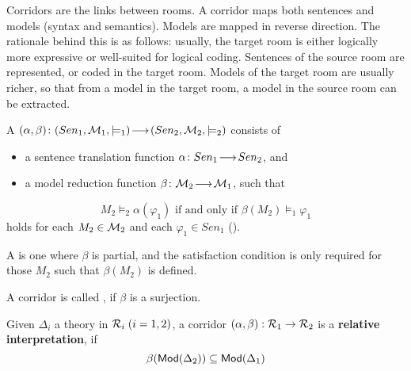 \documentclass[%
\ifpretendfinal
final%
\else
draft%
\fi,
a4paper,
wd]{isov2}
\begin{document}
Corridors are the links between rooms. A corridor maps both sentences
and models (syntax and semantics). Models are mapped in reverse
direction. The rationale behind this is as follows: usually, the
target room is either logically more expressive or well-suited for
logical coding. Sentences of the source room are represented, or coded
in the target room. Models of the target room are usually richer, so
that from a model in the target room, a model in the source room can
be extracted.
\begin{definition}\label{def:corridor}
A 
$
(\alpha,\beta)\map{(Sen_1,\cM_1,\models_1)}{(Sen_2,\cM_2,\models_2)}
$
 consists of
\begin{itemize}
\item a sentence translation function $\alpha\colon Sen_1\!\longrightarrow\!Sen_2$, and
\item a model reduction function
$\beta\map{\cM_2}{\cM_1}$, 
such that
\end{itemize}
$$M_2\models_2 \alpha(\varphi_1) \mbox{ if and only if } 
\beta(M_2)\models_1 \varphi_1$$
holds for each $M_2\in \cM_2$ and each $\varphi_1\in Sen_1$
().

A  is one where $\beta$ is partial,
and the satisfaction condition is only required for those $M_2$
such that $\beta(M_2)$ is defined.
\end{definition}
A corridor is called , if $\beta$ is a surjection.

\begin{definition}
  Given $\Delta_i$ a theory in $\cR_i\;(i=1,2)$, a corridor $(\alpha,\beta):\cR_1\to \cR_2$ is a \textbf{relative interpretation}, if
\[
\beta(\mathsf{Mod}(\Delta_2))\subseteq \mathsf{Mod}(\Delta_1)
\]
\end{definition}
\end{document}
